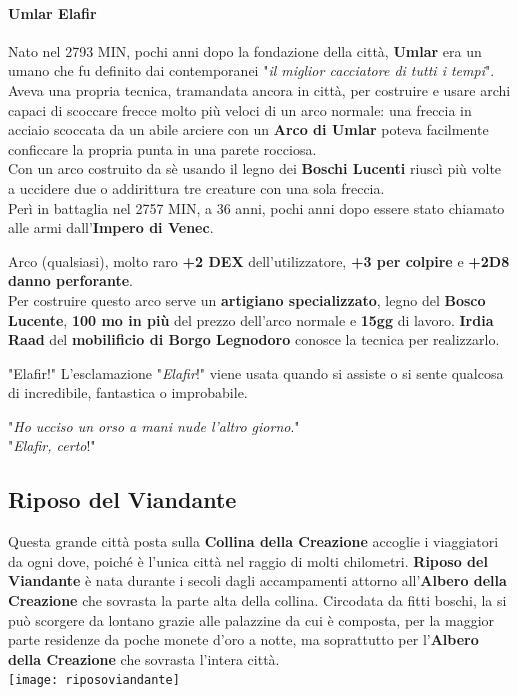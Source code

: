 \documentclass[10pt,twoside,onecolumn,openany]{book}
\begin{document}
\paragraph{Umlar Elafir} Nato nel 2793 MIN, pochi anni dopo la fondazione della città, \textbf{Umlar} era un umano che fu definito dai contemporanei "\textit{il miglior cacciatore di tutti i tempi}". Aveva una propria tecnica, tramandata ancora in città, per costruire e usare archi capaci di scoccare frecce molto più veloci di un arco normale: una freccia in acciaio scoccata da un abile arciere con un \textbf{Arco di Umlar} poteva facilmente conficcare la propria punta in una parete rocciosa.\\
Con un arco costruito da sè usando il legno dei \textbf{Boschi Lucenti} riuscì più volte a uccidere due o addirittura tre creature con una sola freccia.\\
Perì in battaglia nel 2757 MIN, a 36 anni, pochi anni dopo essere stato chiamato alle armi dall'\textbf{Impero di Venec}.
\begin{multicols}{2}
{Arco (qualsiasi), molto raro}
\textbf{+2 DEX} dell'utilizzatore, \textbf{+3 per colpire} e \textbf{+2D8 danno perforante}.\\
Per costruire questo arco serve un \textbf{artigiano specializzato}, legno del \textbf{Bosco Lucente}, \textbf{100 mo in più} del prezzo dell'arco normale e \textbf{15gg} di lavoro. \textbf{Irdia Raad} del \textbf{mobilificio di Borgo Legnodoro} conosce la tecnica per realizzarlo.
\columnbreak
\begin{commentbox}{{"Elafir!"}}
	L'esclamazione "\textit{Elafir}!" viene usata quando si assiste o si sente qualcosa di incredibile, fantastica o improbabile.
	\begin{quotebox}
		"\textit{Ho ucciso un orso a mani nude l'altro giorno}."\\
		"\textit{Elafir, certo}!"
	\end{quotebox}
\end{commentbox}
\end{multicols}
\newpage
\subsection{Riposo del Viandante}
Questa grande città posta sulla \textbf{Collina della Creazione} accoglie i viaggiatori da ogni dove, poiché è l'unica città nel raggio di molti chilometri. \textbf{Riposo del Viandante} è nata durante i secoli dagli accampamenti attorno all'\textbf{Albero della Creazione} che sovrasta la parte alta della collina. Circodata da fitti boschi, la si può scorgere da lontano grazie alle palazzine da cui è composta, per la maggior parte residenze da poche monete d'oro a notte, ma soprattutto per l'\textbf{Albero della Creazione} che sovrasta l'intera città.\\
\texttt{[image: riposoviandante]}
\end{document}
